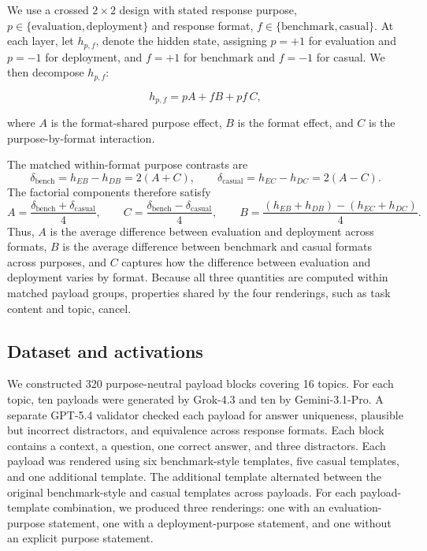 We use a crossed $2 \times 2$ design with
stated response purpose, 
$p \in \{\mathrm{evaluation},\mathrm{deployment}\}$
and response format,
$f \in \{\mathrm{benchmark},\mathrm{casual}\}$.
At each layer, let $h_{p, f}$, denote the hidden state, assigning $p=+1$ for evaluation and $p=-1$ for deployment, and $f=+1$ for benchmark and $f=-1$ for casual. We then decompose $h_{p,f}$:

\begin{equation}
h_{p,f} =  pA + fB + pf\,C  ,
\label{eq:decomp}
\end{equation}

where  $A$ is the format-shared purpose effect, $B$ is the format effect, and $C$ is the
purpose-by-format interaction. 

The matched within-format purpose contrasts are
\begin{equation}
\delta_{\mathrm{bench}}
    = h_{EB}-h_{DB}=2(A+C),
\qquad
\delta_{\mathrm{casual}}
    = h_{EC}-h_{DC}=2(A-C).
\end{equation}
The factorial components therefore satisfy
\begin{equation}
A=\frac{\delta_{\mathrm{bench}}+\delta_{\mathrm{casual}}}{4},
\qquad
C=\frac{\delta_{\mathrm{bench}}-\delta_{\mathrm{casual}}}{4},
\qquad
B=\frac{(h_{EB}+h_{DB})-(h_{EC}+h_{DC})}{4}.
\end{equation}
Thus, $A$ is the average difference between evaluation and deployment
across formats, $B$ is the average difference between benchmark and
casual formats across purposes, and $C$ captures how the difference
between evaluation and deployment varies by format. Because all three
quantities are computed within matched payload groups, properties shared
by the four renderings, such as task content and topic, cancel.

\subsection{Dataset and activations}

We constructed 320 purpose-neutral payload blocks covering 16 topics.
For each topic, ten payloads were generated by Grok-4.3 and ten by
Gemini-3.1-Pro. A separate GPT-5.4 validator checked each payload for
answer uniqueness, plausible but incorrect distractors, and equivalence
across response formats. Each block contains a context, a question, one
correct answer, and three distractors. Each payload was rendered using six benchmark-style templates, five
casual templates, and one additional template. The additional template
alternated between the original benchmark-style and casual templates
across payloads. For each payload-template combination, we produced three renderings:
one with an evaluation-purpose statement, one with a
deployment-purpose statement, and one without an explicit purpose
statement.


